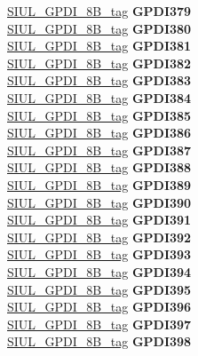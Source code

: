 \begin{DoxyCompactItemize}
\begin{tabbing}
\>\>\mbox{\hyperlink{unionSIUL__GPDI__8B__tag}{SIUL\_GPDI\_8B\_tag}} {\bfseries GPDI379}\\
\>\>\mbox{\hyperlink{unionSIUL__GPDI__8B__tag}{SIUL\_GPDI\_8B\_tag}} {\bfseries GPDI380}\\
\>\>\mbox{\hyperlink{unionSIUL__GPDI__8B__tag}{SIUL\_GPDI\_8B\_tag}} {\bfseries GPDI381}\\
\>\>\mbox{\hyperlink{unionSIUL__GPDI__8B__tag}{SIUL\_GPDI\_8B\_tag}} {\bfseries GPDI382}\\
\>\>\mbox{\hyperlink{unionSIUL__GPDI__8B__tag}{SIUL\_GPDI\_8B\_tag}} {\bfseries GPDI383}\\
\>\>\mbox{\hyperlink{unionSIUL__GPDI__8B__tag}{SIUL\_GPDI\_8B\_tag}} {\bfseries GPDI384}\\
\>\>\mbox{\hyperlink{unionSIUL__GPDI__8B__tag}{SIUL\_GPDI\_8B\_tag}} {\bfseries GPDI385}\\
\>\>\mbox{\hyperlink{unionSIUL__GPDI__8B__tag}{SIUL\_GPDI\_8B\_tag}} {\bfseries GPDI386}\\
\>\>\mbox{\hyperlink{unionSIUL__GPDI__8B__tag}{SIUL\_GPDI\_8B\_tag}} {\bfseries GPDI387}\\
\>\>\mbox{\hyperlink{unionSIUL__GPDI__8B__tag}{SIUL\_GPDI\_8B\_tag}} {\bfseries GPDI388}\\
\>\>\mbox{\hyperlink{unionSIUL__GPDI__8B__tag}{SIUL\_GPDI\_8B\_tag}} {\bfseries GPDI389}\\
\>\>\mbox{\hyperlink{unionSIUL__GPDI__8B__tag}{SIUL\_GPDI\_8B\_tag}} {\bfseries GPDI390}\\
\>\>\mbox{\hyperlink{unionSIUL__GPDI__8B__tag}{SIUL\_GPDI\_8B\_tag}} {\bfseries GPDI391}\\
\>\>\mbox{\hyperlink{unionSIUL__GPDI__8B__tag}{SIUL\_GPDI\_8B\_tag}} {\bfseries GPDI392}\\
\>\>\mbox{\hyperlink{unionSIUL__GPDI__8B__tag}{SIUL\_GPDI\_8B\_tag}} {\bfseries GPDI393}\\
\>\>\mbox{\hyperlink{unionSIUL__GPDI__8B__tag}{SIUL\_GPDI\_8B\_tag}} {\bfseries GPDI394}\\
\>\>\mbox{\hyperlink{unionSIUL__GPDI__8B__tag}{SIUL\_GPDI\_8B\_tag}} {\bfseries GPDI395}\\
\>\>\mbox{\hyperlink{unionSIUL__GPDI__8B__tag}{SIUL\_GPDI\_8B\_tag}} {\bfseries GPDI396}\\
\>\>\mbox{\hyperlink{unionSIUL__GPDI__8B__tag}{SIUL\_GPDI\_8B\_tag}} {\bfseries GPDI397}\\
\>\>\mbox{\hyperlink{unionSIUL__GPDI__8B__tag}{SIUL\_GPDI\_8B\_tag}} {\bfseries GPDI398}\\

\end{tabbing}
\end{DoxyCompactItemize}
